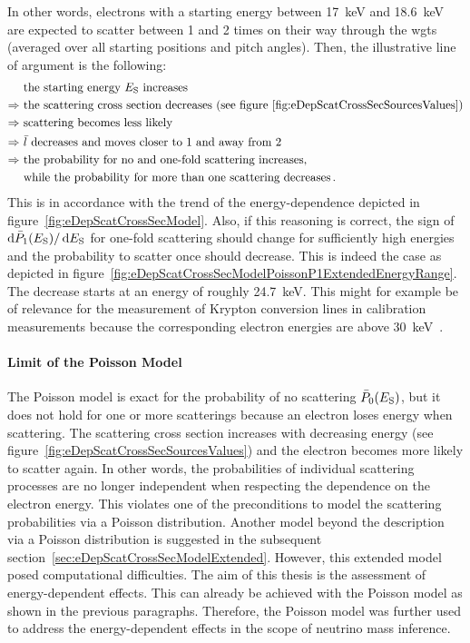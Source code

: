 In other words, electrons with a starting energy between \SI{17}{keV} and \SI{18.6}{keV} are expected to scatter between 1 and 2 times on their way through the \gls{wgts} (averaged over all starting positions and pitch angles). Then, the illustrative line of argument is the following: 
\begin{align*}
	&\text{ the starting energy $E_\mathrm{S}$ increases} \\ \Rightarrow
	&\text{ the scattering cross section decreases (see figure~\ref{fig:eDepScatCrossSecSourcesValues})} \\ \Rightarrow
	&\text{ scattering becomes less likely} \\ \Rightarrow
	&\text{ $\bar{l}$ decreases and moves closer to 1 and away from 2} \\ \Rightarrow
	&\text{ the probability for no and one-fold scattering increases,} \\
	&\text{ while the probability for more than one scattering decreases}
	\text{\,.}
\end{align*} 
This is in accordance with the trend of the energy-dependence depicted in figure~\ref{fig:eDepScatCrossSecModel}. Also, if this reasoning is correct, the sign of $\mathop{}\!\mathrm{d} \bar{P}_1(E_\mathrm{S}) / \mathop{}\!\mathrm{d} E_\mathrm{S}$ for one-fold scattering should change for sufficiently high energies and the probability to scatter once should decrease. This is indeed the case as depicted in figure~\ref{fig:eDepScatCrossSecModelPoissonP1ExtendedEnergyRange}. The decrease starts at an energy of roughly \SI{24.7}{keV}. This might for example be of relevance for the measurement of Krypton conversion lines in calibration measurements because the corresponding electron energies are above \SI{30}{keV}~\cite{WU2001}. 


\paragraph{Limit of the Poisson Model}
The Poisson model is exact for the probability of no scattering $\bar{P}_0(E_\mathrm{S})$, but it does not hold for one or more scatterings because an electron loses energy when scattering. The scattering cross section increases with decreasing energy (see figure~\ref{fig:eDepScatCrossSecSourcesValues}) and the electron becomes more likely to scatter again. In other words, the probabilities of individual scattering processes are no longer independent when respecting the dependence on the electron energy. This violates one of the preconditions to model the scattering probabilities via a Poisson distribution. Another model beyond the description via a Poisson distribution is suggested in the subsequent section~\ref{sec:eDepScatCrossSecModelExtended}. However, this extended model posed computational difficulties. The aim of this thesis is the assessment of energy-dependent effects. This can already be achieved with the Poisson model as shown in the previous paragraphs. Therefore, the Poisson model was further used to address the energy-dependent effects in the scope of neutrino mass inference.
\FloatBarrier

